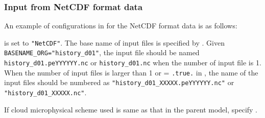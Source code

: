 \subsubsection{Input from NetCDF format data} \label{sec:datainput_scale}

An example of configurations in  for the NetCDF format data is as follows:


 is set to \verb|"NetCDF"|.
The base name of input files is specified by .
Given \verb|BASENAME_ORG="history_d01"|, the input file should be named \verb|history_d01.peYYYYYY.nc| or \verb|history_d01.nc| when the number of input file is 1.
When the number of input files is larger than 1 or  = \verb|.true.| in ,
the name of the input files should be numbered as \verb|"history_d01_XXXXX.peYYYYYY.nc"| or \verb|"history_d01_XXXXX.nc"|.

If cloud microphysical scheme used is same as that in the parent model, specify .

